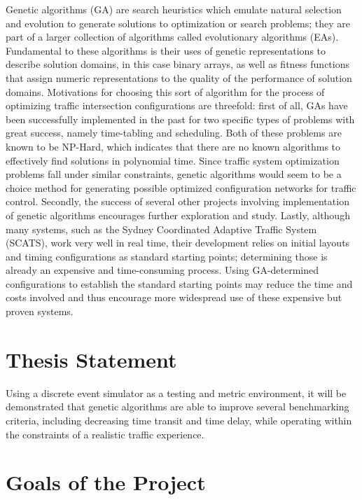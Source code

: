 Genetic algorithms (GA) are search heuristics which emulate natural selection and evolution to generate solutions to optimization or search problems; they are part of a larger collection of algorithms called evolutionary algorithms (EAs).  Fundamental to these algorithms is their uses of genetic representations to describe solution domains, in this case  binary arrays, as well as fitness functions that assign  numeric representations to the quality of the performance of solution domains.  Motivations for choosing this sort of algorithm for the process of optimizing traffic intersection configurations are threefold:  first of all, GAs have been successfully implemented in the past for two specific types of problems with great success, namely time-tabling and scheduling.  Both of these problems are known to be NP-Hard, which indicates that there are no known algorithms to effectively find  solutions in polynomial time.  Since traffic system optimization problems fall under similar constraints, genetic algorithms would seem to be a choice method for generating possible optimized configuration networks for traffic control.  Secondly, the success of several other projects involving implementation of genetic algorithms encourages further exploration and study.  Lastly, although many systems, such as the Sydney Coordinated Adaptive Traffic System (SCATS), work very well in real time, their development relies on initial layouts and timing configurations as standard starting points; determining those is already an expensive and time-consuming process.  Using GA-determined configurations to establish the standard starting points may reduce the time and costs involved  and thus encourage  more widespread use of these expensive  but proven systems.

\section{Thesis Statement}\label{sec:thesis}

Using a discrete event simulator as a testing and metric environment, it will be demonstrated that genetic algorithms are able to improve several benchmarking criteria, including decreasing time transit and time delay, while operating within the constraints of a realistic traffic experience. 

\section{Goals of the Project}\label{sec:goals}

